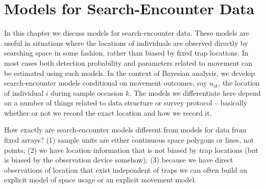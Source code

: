 \chapter{Models for  Search-Encounter Data}
\label{chapt.search-encounter}

\vspace{0.3cm}


In this chapter we discuss models for search-encounter data. These
models are useful in situations where the
locations of individuals are observed directly by
searching space in some fashion, rather than biased by fixed trap locations. In most cases both detection
probability and parameters related to movement can be estimated using such models. In
the context of Bayesian analysis, we develop search-encounter models
conditional on movement outcomes, say $u_{ik}$, the location of
individual $i$ during sample occasion $k$.  The models we
differentiate here depend on a number of things related to data
structure or survey protocol -- basically whether or not we record the exact
location and how we record it.

How exactly are search-encounter models different from models for data from fixed
arrays?  (1) sample units are either continuous space polygons or
lines, not points; (2) we have location information that is not biased
by trap locations (but is biased by the observation device somehow);
(3) because we have direct observations of location that exist
independent of traps we can often build an explicit model of space
usage or an explicit movement model.

